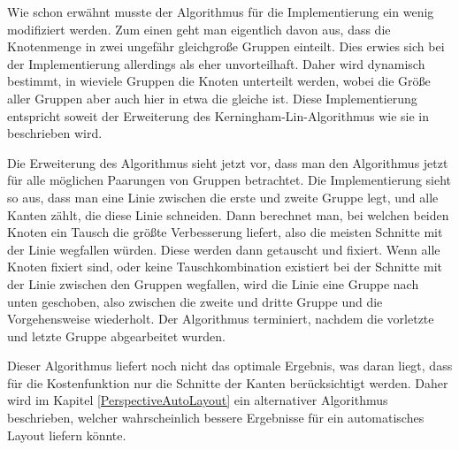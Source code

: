 Wie schon erwähnt musste der Algorithmus für die Implementierung ein wenig
modifiziert werden. Zum einen  geht man eigentlich davon aus, dass die
Knotenmenge in zwei ungefähr gleichgroße Gruppen einteilt. Dies erwies sich bei
der Implementierung allerdings als eher unvorteilhaft. Daher wird dynamisch
bestimmt, in wieviele Gruppen die Knoten unterteilt werden, wobei die Größe
aller Gruppen aber auch hier in etwa die gleiche ist. Diese
Implementierung entspricht soweit der Erweiterung des
Kerningham-Lin-Algorithmus wie sie in \cite{Layout} beschrieben
wird.\vspace{10pt}

Die Erweiterung des Algorithmus sieht jetzt vor, dass man den Algorithmus jetzt
für alle möglichen Paarungen von Gruppen betrachtet. Die Implementierung
sieht so aus, dass man eine Linie zwischen die erste und zweite Gruppe legt, und
alle Kanten zählt, die diese Linie schneiden. Dann berechnet man, bei
welchen beiden Knoten ein Tausch die größte Verbesserung liefert, also die
meisten Schnitte mit der Linie wegfallen würden. Diese werden dann getauscht und
fixiert. Wenn alle Knoten fixiert sind, oder keine Tauschkombination existiert
bei der Schnitte mit der Linie zwischen den Gruppen wegfallen, wird die Linie
eine Gruppe nach unten geschoben, also zwischen die zweite und dritte Gruppe und
die Vorgehensweise wiederholt. Der Algorithmus terminiert, nachdem die vorletzte
und letzte Gruppe abgearbeitet wurden.\vspace{10pt}

Dieser Algorithmus liefert noch nicht das optimale Ergebnis, was daran liegt,
dass für die Kostenfunktion nur die Schnitte der Kanten berücksichtigt werden.
Daher wird im Kapitel \ref{PerspectiveAutoLayout} ein alternativer Algorithmus beschrieben,
welcher wahrscheinlich bessere Ergebnisse für ein automatisches Layout liefern
könnte.\vspace{10pt}

